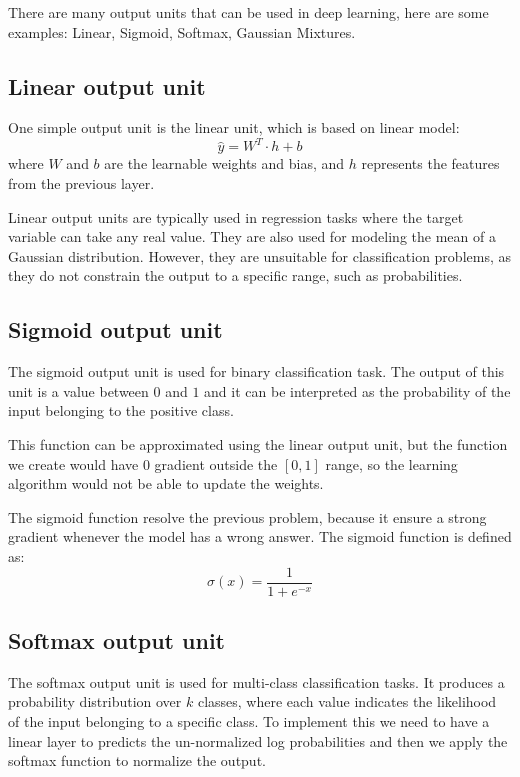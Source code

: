 There are many output units that can be used in deep learning, here are some examples:
Linear, Sigmoid, Softmax, Gaussian Mixtures.
\subsection{Linear output unit}
One simple output unit is the linear unit, which is based on linear model:
\begin{equation}
    \hat{y} = W^T \cdot h + b
\end{equation}
where $W$ and $b$ are the learnable weights and bias, and $h$ represents the features
from the previous layer.

Linear output units are typically used in regression tasks where the target variable
can take any real value. They are also used for modeling the mean of a Gaussian
distribution. However, they are unsuitable for classification problems, as they
do not constrain the output to a specific range, such as probabilities.
\subsection{Sigmoid output unit}
The sigmoid output unit is used for binary classification task. The output
of this unit is a value between $0$ and $1$ and it can be interpreted as the
probability of the input belonging to the positive class.

This function can be approximated using the linear output unit, but the function
we create would have 0 gradient outside the $[0, 1]$ range, so the learning
algorithm would not be able to update the weights.

The sigmoid function resolve the previous problem, because it ensure a strong
gradient whenever the model has a wrong answer. The sigmoid function is defined as:
\begin{equation}
    \sigma(x) = \frac{1}{1+e^{-x}}
\end{equation}
\subsection{Softmax output unit}
The softmax output unit is used for multi-class classification tasks. It produces
a probability distribution over $k$ classes, where each value indicates the likelihood
of the input belonging to a specific class. To implement this we need to have a
linear layer to predicts the un-normalized log probabilities and then we apply
the softmax function to normalize the output.

